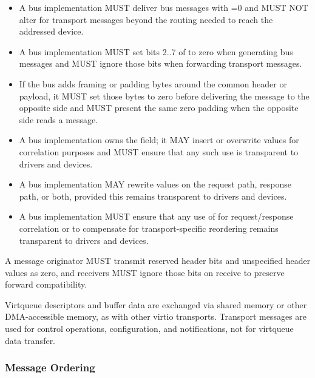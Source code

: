 \begin{itemize}
  \item A bus implementation MUST deliver bus messages with =0
        and MUST NOT alter  for transport messages beyond the
        routing needed to reach the addressed device.
  \item A bus implementation MUST set bits 2..7 of  to zero when
        generating bus messages and MUST ignore those bits when forwarding
        transport messages.
  \item If the bus adds framing or padding bytes around the common header or
        payload, it MUST set those bytes to zero before delivering the message
        to the opposite side and MUST present the same zero padding when the
        opposite side reads a message.
  \item A bus implementation owns the  field; it MAY insert or
        overwrite values for correlation purposes and MUST ensure that any such
        use is transparent to drivers and devices.
  \item A bus implementation MAY rewrite  values on the request
        path, response path, or both, provided this remains transparent to
        drivers and devices.
  \item A bus implementation MUST ensure that any use of  for
        request/response correlation or to compensate for transport-specific
        reordering remains transparent to drivers and devices.
\end{itemize}

A message originator MUST transmit reserved header bits and unspecified header
values as zero, and receivers MUST ignore those bits on receive to preserve
forward compatibility.

Virtqueue descriptors and buffer data are exchanged via shared memory or other
DMA-accessible memory, as with other virtio transports. Transport messages are
used for control operations, configuration, and notifications, not for
virtqueue data transfer.

\subsubsection{Message Ordering}
\label{sec:Virtio Transport Options / Virtio Over Messages / Basic Concepts / Ordering}

